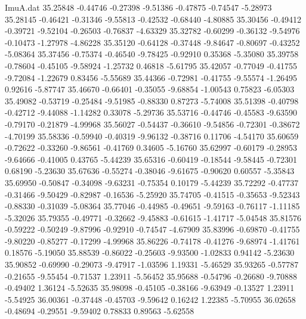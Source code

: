 \begin{filecontents}{ImuA.dat}
  35.25848   -0.44746   -0.27398   -9.51386   -0.47875   -0.74547   -5.28973
  35.28145   -0.46421   -0.31346   -9.55813   -0.42532   -0.68440   -4.80885
  35.30456   -0.49412   -0.39721   -9.52104   -0.26503   -0.76837   -4.63329
  35.32782   -0.60299   -0.36132   -9.54976   -0.10473   -1.27978   -4.86228
  35.35120   -0.64128   -0.37448   -9.84647   -0.80697   -0.43252   -5.08364
  35.37456   -0.75374   -0.46540   -9.78425   -0.92910    0.35368   -5.35080
  35.39758   -0.78604   -0.45105   -9.58924   -1.25732    0.46818   -5.61795
  35.42057   -0.77049   -0.41755   -9.72084   -1.22679    0.83456   -5.55689
  35.44366   -0.72981   -0.41755   -9.55574   -1.26495    0.92616   -5.87747
  35.46670   -0.66401   -0.35055   -9.68854   -1.00543    0.75823   -6.05303
  35.49082   -0.53719   -0.25484   -9.51985   -0.88330    0.87273   -5.74008
  35.51398   -0.40798   -0.42712   -9.44088   -1.14282    0.33078   -5.29736
  35.53716   -0.44746   -0.45583   -9.63590   -0.79170   -0.21879   -4.99968
  35.56027   -0.54437   -0.36610   -9.54856   -0.72301   -0.38672   -4.70199
  35.58336   -0.59940   -0.40319   -9.96132   -0.38716    0.11706   -4.54170
  35.60659   -0.72622   -0.33260   -9.86561   -0.41769    0.34605   -5.16760
  35.62997   -0.60179   -0.28953   -9.64666   -0.41005    0.43765   -5.44239
  35.65316   -0.60419   -0.18544   -9.58445   -0.72301    0.68190   -5.23630
  35.67636   -0.55274   -0.38046   -9.61675   -0.90620    0.60557   -5.35843
  35.69950   -0.50847   -0.34098   -9.63231   -0.75354    0.10179   -5.44239
  35.72292   -0.47737   -0.31466   -9.50429   -0.82987   -0.16536   -5.25920
  35.74705   -0.41515   -0.35653   -9.52343   -0.88330   -0.31039   -5.08364
  35.77046   -0.44985   -0.49651   -9.59163   -0.76117   -1.11185   -5.32026
  35.79355   -0.49771   -0.32662   -9.45883   -0.61615   -1.41717   -5.04548
  35.81576   -0.59222   -0.50249   -9.87996   -0.92910   -0.74547   -4.67909
  35.83996   -0.69870   -0.41755   -9.80220   -0.85277   -0.17299   -4.99968
  35.86226   -0.74178   -0.41276   -9.68974   -1.41761    0.18576   -5.19050
  35.88539   -0.86022   -0.25603   -9.93500   -1.02833    0.94142   -5.23630
  35.90852   -0.69990   -0.29073   -9.47917   -1.03596    1.19331   -5.46529
  35.93265   -0.57787   -0.21655   -9.55454   -0.71537    1.23911   -5.56452
  35.95688   -0.54796   -0.26680   -9.70888   -0.49402    1.36124   -5.52635
  35.98098   -0.45105   -0.38166   -9.63949   -0.13527    1.23911   -5.54925
  36.00361   -0.37448   -0.45703   -9.59642    0.16242    1.22385   -5.70955
  36.02658   -0.48694   -0.29551   -9.59402    0.78833    0.89563   -5.62558

\end{filecontents}
